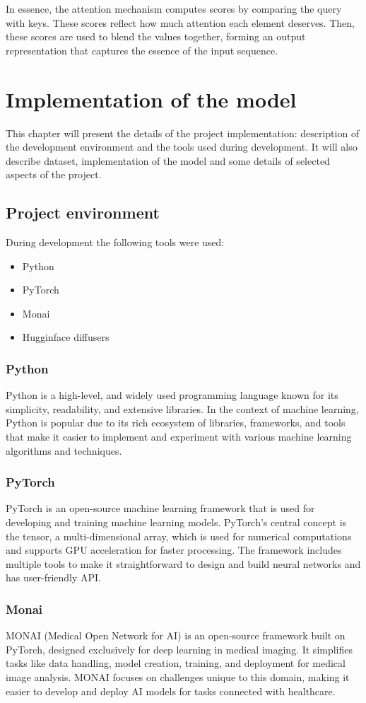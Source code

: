 \documentclass[11pt,a4paper]{report}
\begin{document}
In essence, the attention mechanism computes scores by comparing the query with keys. These scores reflect how much attention each element deserves. Then, these scores are used to blend the values together, forming an output representation that captures the essence of the input sequence. \cite{AttentionIsAll} \cite{AttentionWiki} \cite{TransformersWiki}

\chapter{Implementation of the model}
This chapter will present the details of the project implementation: description of the development environment and the tools used during development. It will also describe dataset, implementation of the model and some details of selected aspects of the project.
\section{Project environment}
During development the following tools were used:
\begin{itemize}
\item Python 
\item PyTorch
\item Monai
\item Hugginface diffusers 
\end{itemize}
\subsection{Python}
Python is a high-level, and widely used programming language known for its simplicity, readability, and extensive libraries. In the context of machine learning, Python is popular due to its rich ecosystem of libraries, frameworks, and tools that make it easier to implement and experiment with various machine learning algorithms and techniques. \cite{Python}
\subsection{PyTorch}
PyTorch is an open-source machine learning framework that is used for developing and training machine learning models. PyTorch's central concept is the tensor, a multi-dimensional array, which is used for numerical computations and supports GPU acceleration for faster processing. The framework includes multiple tools to make it straightforward to design and build neural networks and has user-friendly API. \cite{Pytorch}
\subsection{Monai}
MONAI (Medical Open Network for AI) is an open-source framework built on PyTorch, designed exclusively for deep learning in medical imaging. It simplifies tasks like data handling, model creation, training, and deployment for medical image analysis. MONAI focuses on challenges unique to this domain, making it easier to develop and deploy AI models for tasks connected with healthcare. \cite{Monai}
\end{document}

